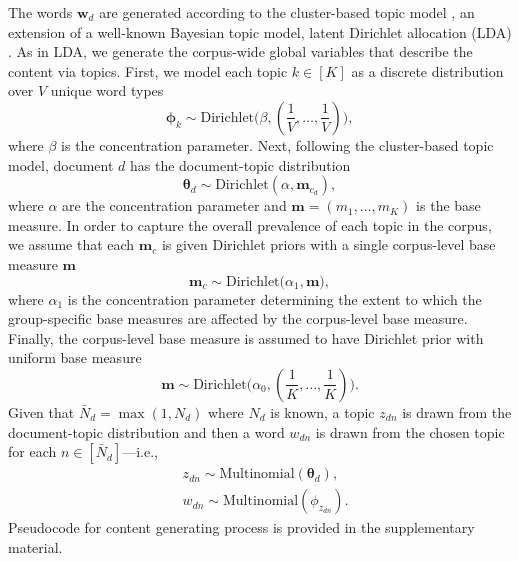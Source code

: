 \documentclass{article}
\begin{document}
The words $\boldsymbol{w}_d$ are generated according to the cluster-based topic model \cite{wallach2008structured}, an extension of a well-known Bayesian topic model, latent Dirichlet allocation (LDA) \cite{Blei2003}. As in LDA, we generate the corpus-wide global variables that describe the content via topics. First, we model each topic $k\in [K]$ as a discrete distribution over $V$ unique word types 
\begin{equation}
\boldsymbol{\phi}_k \sim \mbox{Dirichlet}\Big(\beta, (\frac{1}{V},\ldots,\frac{1}{V})\Big),
\end{equation}
where $\beta$ is the concentration parameter. Next, following the cluster-based topic model, document $d$ has the document-topic distribution
\begin{equation}
	\boldsymbol{\theta}_d \sim \mbox{Dirichlet}(\alpha, \boldsymbol{m}_{c_d}),
\end{equation}
where $\alpha$ are the concentration parameter and $\boldsymbol{m}=(m_1,\ldots,m_K)$ is the base measure.
In order to capture the overall prevalence of each topic in the corpus, we assume that each $\boldsymbol{m}_{c}$ is given Dirichlet priors with a single corpus-level base measure $\boldsymbol{m}$
	\begin{equation}
\boldsymbol{m}_c\sim \mbox{Dirichlet}\Big(\alpha_1, \boldsymbol{m}\Big),
	\end{equation}
	where $\alpha_1$ is the concentration parameter determining the extent to which the group-specific base measures are affected by the corpus-level base measure. Finally, the corpus-level base measure is assumed to have Dirichlet prior with uniform base measure
		\begin{equation}
			\boldsymbol{m}\sim \mbox{Dirichlet}\Big(\alpha_0, (\frac{1}{K},\ldots,\frac{1}{K})\Big).
		\end{equation}
	Given that $\bar N_d = \max(1, N_d)$ where $N_d$ is known, a topic $z_{dn}$ is drawn from the document-topic distribution and then a word $w_{dn}$ is drawn from the chosen topic for each $n \in [\bar N_d]$---i.e.,
\begin{equation}
\begin{aligned}
&z_{dn} \sim \mbox{Multinomial}(\boldsymbol{\theta}_d),\\
&w_{dn} \sim\mbox{Multinomial} (\phi_{z_{dn}}).
\end{aligned}
\end{equation}
Pseudocode for content generating process is provided in the supplementary material.
\end{document}
